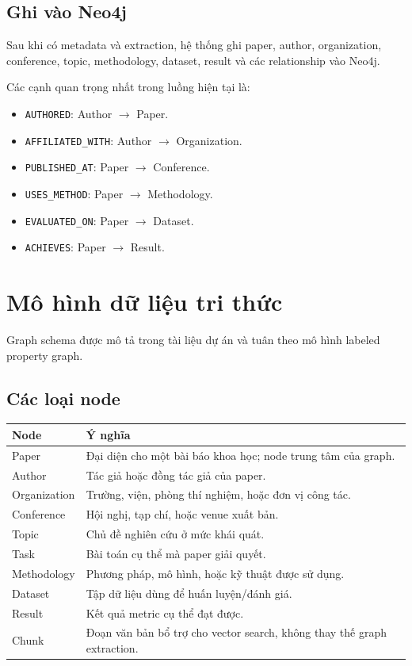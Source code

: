 \documentclass[12pt,a4paper]{article}
\begin{document}
\subsection{Ghi vào Neo4j}
Sau khi có metadata và extraction, hệ thống ghi paper, author, organization, conference, topic, methodology, dataset, result và các relationship vào Neo4j.

Các cạnh quan trọng nhất trong luồng hiện tại là:
\begin{itemize}[leftmargin=1.6em]
  \item \texttt{AUTHORED}: Author $\rightarrow$ Paper.
  \item \texttt{AFFILIATED\_WITH}: Author $\rightarrow$ Organization.
  \item \texttt{PUBLISHED\_AT}: Paper $\rightarrow$ Conference.
  \item \texttt{USES\_METHOD}: Paper $\rightarrow$ Methodology.
  \item \texttt{EVALUATED\_ON}: Paper $\rightarrow$ Dataset.
  \item \texttt{ACHIEVES}: Paper $\rightarrow$ Result.
\end{itemize}

\section{Mô hình dữ liệu tri thức}
Graph schema được mô tả trong tài liệu dự án và tuân theo mô hình labeled property graph.

\subsection{Các loại node}
\begin{longtable}{>{\raggedright\arraybackslash}p{3.2cm} p{10.6cm}}
\toprule
\textbf{Node} & \textbf{Ý nghĩa} \\
\midrule
Paper & Đại diện cho một bài báo khoa học; node trung tâm của graph. \\
Author & Tác giả hoặc đồng tác giả của paper. \\
Organization & Trường, viện, phòng thí nghiệm, hoặc đơn vị công tác. \\
Conference & Hội nghị, tạp chí, hoặc venue xuất bản. \\
Topic & Chủ đề nghiên cứu ở mức khái quát. \\
Task & Bài toán cụ thể mà paper giải quyết. \\
Methodology & Phương pháp, mô hình, hoặc kỹ thuật được sử dụng. \\
Dataset & Tập dữ liệu dùng để huấn luyện/đánh giá. \\
Result & Kết quả metric cụ thể đạt được. \\
Chunk & Đoạn văn bản bổ trợ cho vector search, không thay thế graph extraction. \\
\bottomrule
\end{longtable}
\end{document}
